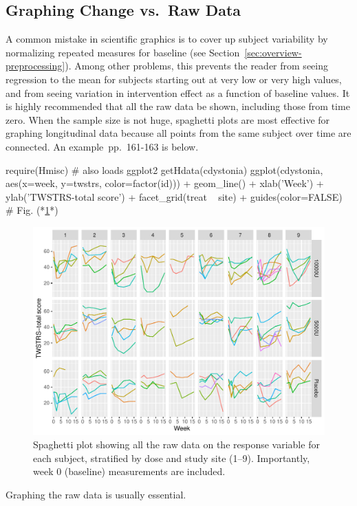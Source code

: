 \subsection{Graphing Change vs.\ Raw Data}
A common mistake in scientific graphics is to cover up subject
variability by normalizing repeated measures for baseline (see
Section~\ref{sec:overview-preprocessing}).  Among other problems, this
prevents the reader from seeing regression to the mean for subjects
starting out at very low or very high values, and from seeing
variation in intervention effect as a function of baseline values.  It
is highly recommended that all the raw data be shown, including those
from time zero.  When the sample size is not huge, spaghetti plots are
most effective for graphing longitudinal data because all points from
the same subject over time are connected.  An
example~\citep{davis-repmeas}{pp.\ 161-163} is below. 
\begin{Schunk}
\begin{Sinput}
require(Hmisc)   # also loads ggplot2
getHdata(cdystonia)
ggplot(cdystonia, aes(x=week, y=twstrs, color=factor(id))) +
       geom_line() + xlab('Week') + ylab('TWSTRS-total score') +
       facet_grid(treat ~ site) +
       guides(color=FALSE) # Fig. (*\ref{fig:descript-spaghetti}*)
\end{Sinput}
\begin{figure}[htbp]

\centerline{\includegraphics[width=\maxwidth]{descript-spaghetti-1} }

\caption[Spaghetti plot]{Spaghetti plot showing all the raw data on the response variable for each subject, stratified by dose and study site (1--9).  Importantly, week 0 (baseline) measurements are included.}\label{fig:descript-spaghetti}
\end{figure}
\end{Schunk}
Graphing the raw data is usually essential.

